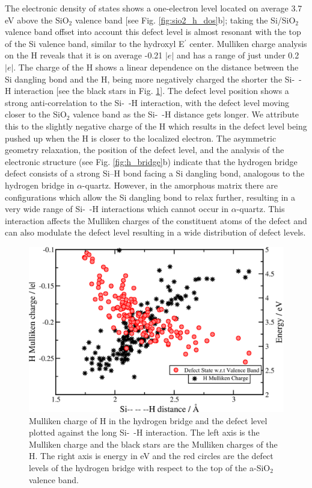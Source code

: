 \documentclass[aps,prb,reprint,superscriptaddress,showpacs]{revtex4-1}
\begin{document}
The electronic density of states shows a one-electron level located on average 3.7 eV above the SiO$_2$ valence band [see Fig. \ref{fig:sio2_h_dos}b]; taking the Si/SiO$_2$ valence band offset into account this defect level is almost resonant with the top of the Si valence band, similar to the hydroxyl E$^\prime$ center. Mulliken charge analysis on the H reveals that it is on average -0.21 $|e|$ and has a range of just under 0.2 $|e|$. The charge of the H shows a linear dependence on the distance between the Si dangling bond and the H, being more negatively charged the shorter the \mbox{Si- -H} interaction [see the black stars in Fig. \ref{fig:hbridge_correlation}]. The defect level position shows a strong anti-correlation to the \mbox{Si- -H} interaction, with the defect level moving closer to the SiO$_2$ valence band as the \mbox{Si- -H} distance gets longer. We attribute this to the slightly negative charge of the H which results in the defect level being pushed up when the H is closer to the localized electron. The asymmetric geometry relaxation, the position of the defect level, and the analysis of the electronic structure (see Fig. \ref{fig:h_bridge}b) indicate that the hydrogen bridge defect consists of a strong \mbox{Si--H} bond facing a Si dangling bond, analogous to the hydrogen bridge in $\alpha$-quartz. However, in the amorphous matrix there are configurations which allow the Si dangling bond to relax further, resulting in a very wide range of \mbox{Si- -H} interactions which cannot occur in $\alpha$-quartz. This interaction affects the Mulliken charges of the constituent atoms of the defect and can also modulate the defect level resulting in a wide distribution of defect levels.

\begin{figure}[h!]
\includegraphics{hbridge_analysis.png}
\caption{Mulliken charge of H in the hydrogen bridge and the defect level plotted against the long \mbox{Si- -H} interaction. The left axis is the Mulliken charge and the black stars are the Mulliken charges of the H. The right axis is energy in eV and the red circles are the defect levels of the hydrogen bridge with respect to the top of the a-SiO$_2$ valence band.} 
\label{fig:hbridge_correlation}
\end{figure}
\end{document}
